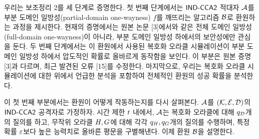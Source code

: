 \documentclass{article}
\begin{document}
우리는 보조정리 2를 세 단계로 증명한다. 첫 번째 단계에서는 $\textsf{IND-CCA2}$ 적대자
$\mathcal{A}$를 부분 도메인 일방성(partial-domain one-wayness) $f$를 깨뜨리는 알고리즘
$\mathcal{B}$로 환원하는 과정을 제시한다. 현재의 증명에서는 원본 논문 [3]에서와 같은
전체 도메인 일방성(full-domain one-wayness)이 아니라, 부분 도메인 일방성
하에서의 보안성에만 관심을 둔다. 두 번째 단계에서는 이 환원에서 사용된 복호화
오라클 시뮬레이션이 부분 도메인 일방성 하에서 압도적인 확률로 올바르게 동작함을
보인다. 이 부분은 원본 증명 [3]과 다르며, 최근 발견된 오류 [15]를 수정한다.
마지막으로, 우리는 복호화 오라클 시뮬레이션에 대한 위에서 언급한 분석을 포함하여
전체적인 환원의 성공 확률을 분석한다.

이 첫 번째 부분에서는 환원이 어떻게 작동하는지를 다시 살펴본다. $\mathcal{A}$를
$(\mathcal{K}, \mathcal{E}, \mathcal{D})$의 $\textsf{IND-CCA2}$ 공격자로 가정하자. 시간 제한 $t$ 내에서,
$\mathcal{A}$는 복호화 오라클에 대해 $q_{\mathcal{D}}$개의 질의를 하고, 무작위 오라클 $H,
G$에 대해 각각 $q_{H}, q_{G}$개의 질의를 수행하며, 특정 확률
$\varepsilon$보다 높은 능력치로 올바른 평문을 구별해낸다. 이제 환원 $\mathcal{B}$을 설명한다.
\end{document}
